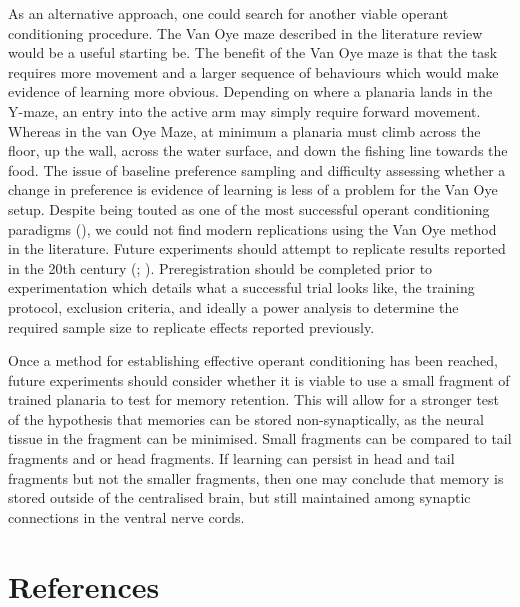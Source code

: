 \documentclass[
  jou,
  floatsintext,
  longtable,
  nolmodern,
  notxfonts,
  notimes,
  donotrepeattitle,
  colorlinks=true,linkcolor=blue,citecolor=blue,urlcolor=blue]{apa7}
\begin{document}
As an alternative approach, one could search for another viable operant
conditioning procedure. The Van Oye maze described in the literature
review would be a useful starting be. The benefit of the Van Oye maze is
that the task requires more movement and a larger sequence of behaviours
which would make evidence of learning more obvious. Depending on where a
planaria lands in the Y-maze, an entry into the active arm may simply
require forward movement. Whereas in the van Oye Maze, at minimum a
planaria must climb across the floor, up the wall, across the water
surface, and down the fishing line towards the food. The issue of
baseline preference sampling and difficulty assessing whether a change
in preference is evidence of learning is less of a problem for the Van
Oye setup. Despite being touted as one of the most successful operant
conditioning paradigms
(),
we could not find modern replications using the Van Oye method in the
literature. Future experiments should attempt to replicate results
reported in the 20th century
(;
). Preregistration should be
completed prior to experimentation which details what a successful trial
looks like, the training protocol, exclusion criteria, and ideally a
power analysis to determine the required sample size to replicate
effects reported previously.

Once a method for establishing effective operant conditioning has been
reached, future experiments should consider whether it is viable to use
a small fragment of trained planaria to test for memory retention. This
will allow for a stronger test of the hypothesis that memories can be
stored non-synaptically, as the neural tissue in the fragment can be
minimised. Small fragments can be compared to tail fragments and or head
fragments. If learning can persist in head and tail fragments but not
the smaller fragments, then one may conclude that memory is stored
outside of the centralised brain, but still maintained among synaptic
connections in the ventral nerve cords.

\section{References}\label{sec-references}
\end{document}
